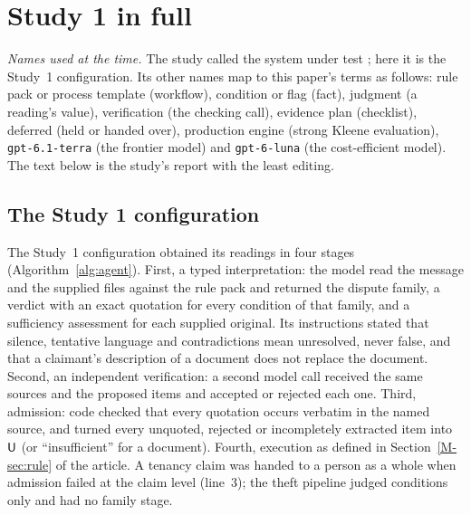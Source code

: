\section{Study 1 in full}
\label{app:study1}

\emph{Names used at the time.} The study called the system under test \casepath; here it is the Study~1 configuration. Its other names map to this paper's terms as follows: rule pack or process template (workflow), condition or flag (fact), judgment (a reading's value), verification (the checking call), evidence plan (checklist), deferred (held or handed over), production engine (strong Kleene evaluation), \texttt{gpt-6.1-terra} (the frontier model) and \texttt{gpt-6-luna} (the cost-efficient model). The text below is the study's report with the least editing.

\subsection{The Study 1 configuration}
\label{sec:agent}

The Study~1 configuration obtained its readings in four stages (Algorithm~\ref{alg:agent}). First, a typed interpretation: the model read the message and the supplied files against the rule pack and returned the dispute family, a verdict with an exact quotation for every condition of that family, and a sufficiency assessment for each supplied original. Its instructions stated that silence, tentative language and contradictions mean unresolved, never false, and that a claimant's description of a document does not replace the document. Second, an independent verification: a second model call received the same sources and the proposed items and accepted or rejected each one. Third, admission: code checked that every quotation occurs verbatim in the named source, and turned every unquoted, rejected or incompletely extracted item into $\mathsf{U}$ (or ``insufficient'' for a document). Fourth, execution as defined in Section~\ref{M-sec:rule} of the article. A tenancy claim was handed to a person as a whole when admission failed at the claim level (line~3); the theft pipeline judged conditions only and had no family stage.


